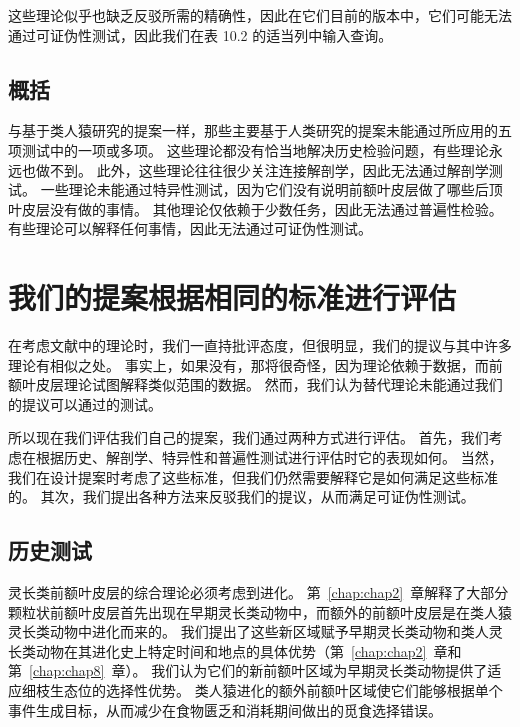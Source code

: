 这些理论似乎也缺乏反驳所需的精确性，因此在它们目前的版本中，它们可能无法通过可证伪性测试，因此我们在表 10.2 的适当列中输入查询。



\subsection{概括}

与基于类人猿研究的提案一样，那些主要基于人类研究的提案未能通过所应用的五项测试中的一项或多项。
这些理论都没有恰当地解决历史检验问题，有些理论永远也做不到。
此外，这些理论往往很少关注连接解剖学，因此无法通过解剖学测试。
一些理论未能通过特异性测试，因为它们没有说明前额叶皮层做了哪些后顶叶皮层没有做的事情。
其他理论仅依赖于少数任务，因此无法通过普遍性检验。
有些理论可以解释任何事情，因此无法通过可证伪性测试。



\section{我们的提案根据相同的标准进行评估}

在考虑文献中的理论时，我们一直持批评态度，但很明显，我们的提议与其中许多理论有相似之处。
事实上，如果没有，那将很奇怪，因为理论依赖于数据，而前额叶皮层理论试图解释类似范围的数据。
然而，我们认为替代理论未能通过我们的提议可以通过的测试。
\par


所以现在我们评估我们自己的提案，我们通过两种方式进行评估。
首先，我们考虑在根据历史、解剖学、特异性和普遍性测试进行评估时它的表现如何。
当然，我们在设计提案时考虑了这些标准，但我们仍然需要解释它是如何满足这些标准的。
其次，我们提出各种方法来反驳我们的提议，从而满足可证伪性测试。



\subsection{历史测试}

灵长类前额叶皮层的综合理论必须考虑到进化。
第~\ref{chap:chap2}~章解释了大部分颗粒状前额叶皮层首先出现在早期灵长类动物中，而额外的前额叶皮层是在类人猿灵长类动物中进化而来的。
我们提出了这些新区域赋予早期灵长类动物和类人灵长类动物在其进化史上特定时间和地点的具体优势（第~\ref{chap:chap2}~章和第~\ref{chap:chap8}~章）。
我们认为它们的新前额叶区域为早期灵长类动物提供了适应细枝生态位的选择性优势。
类人猿进化的额外前额叶区域使它们能够根据单个事件生成目标，从而减少在食物匮乏和消耗期间做出的觅食选择错误。
\par


